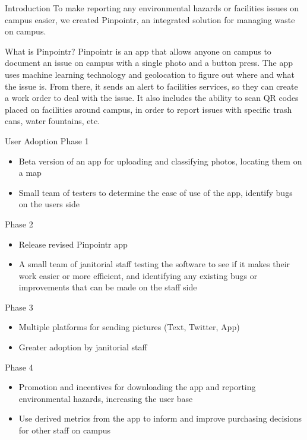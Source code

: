 \documentclass[22pt]{beamer}
\begin{document}
\begin{frame}[fragile]
\begin{textblock}{3.5}
\begin{block}{Introduction}
To make reporting any environmental hazards or facilities issues on campus easier, we created Pinpointr, an integrated solution for managing waste on campus. 
\end{block}

\begin{block}{What is Pinpointr?}
Pinpointr is an app that allows anyone on campus to document an issue on campus with a single photo and a button press. The app uses machine learning technology and geolocation to figure out where and what the issue is. From there, it sends an alert to facilities services, so they can create a work order to deal with the issue. It also includes the ability to scan QR codes placed on facilities around campus, in order to report issues with specific trash cans, water fountains, etc.
\end{block}


\begin{block}{User Adoption}
Phase 1
\begin{itemize}
\item Beta version of an app for uploading and classifying photos, locating them on a map
\item Small team of testers to determine the ease of use of the app, identify bugs on the users side
\end{itemize}
Phase 2
\begin{itemize}
\item Release revised Pinpointr app 
\item A small team of janitorial staff testing the software to see if it makes their work easier or more efficient, and identifying any existing bugs or improvements that can be made on the staff side
\end{itemize}
Phase 3
\begin{itemize}
\item Multiple platforms for sending pictures (Text, Twitter, App)
\item Greater adoption by janitorial staff
\end{itemize}
Phase 4
\begin{itemize}
\item Promotion and incentives for downloading the app and reporting environmental hazards, increasing the user base
\item Use derived metrics from the app to inform and improve purchasing decisions for other staff on campus
\end{itemize}
\end{block}


\end{textblock}
\end{frame}
\end{document}
